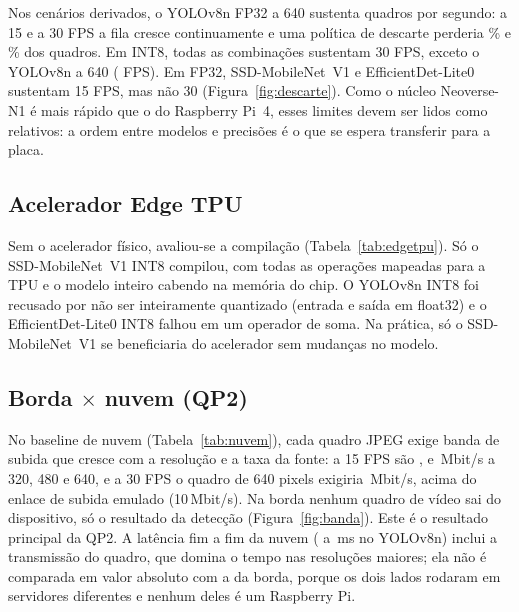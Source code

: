 Nos cenários derivados, o YOLOv8n FP32 a 640 sustenta \fpsYoloFpSeis{} quadros por segundo: a 15 e a 30
FPS a fila cresce continuamente e uma política de descarte perderia \descYoloFpSeisQuinze\% e
\descYoloFpSeisTrinta\% dos quadros. Em INT8, todas as combinações sustentam 30 FPS, exceto o YOLOv8n a
640 (\fpsYoloIntSeis{} FPS). Em FP32, SSD-MobileNet~V1 e EfficientDet-Lite0 sustentam 15 FPS, mas não 30
(Figura~\ref{fig:descarte}). Como o núcleo Neoverse-N1 é mais rápido que o do Raspberry Pi~4, esses
limites devem ser lidos como relativos: a ordem entre modelos e precisões é o que se espera transferir
para a placa.




\subsection{Acelerador Edge TPU}
Sem o acelerador físico, avaliou-se a compilação (Tabela~\ref{tab:edgetpu}). Só o SSD-MobileNet~V1 INT8
compilou, com todas as operações mapeadas para a TPU e o modelo inteiro cabendo na memória do chip. O
YOLOv8n INT8 foi recusado por não ser inteiramente quantizado (entrada e saída em float32) e o
EfficientDet-Lite0 INT8 falhou em um operador de soma. Na prática, só o SSD-MobileNet~V1 se beneficiaria
do acelerador sem mudanças no modelo.



\subsection{Borda $\times$ nuvem (QP2)}
No baseline de nuvem (Tabela~\ref{tab:nuvem}), cada quadro JPEG exige banda de subida que cresce com a
resolução e a taxa da fonte: a 15 FPS são \bandaTresQuinze{}, \bandaQuatroQuinze{} e
\bandaSeisQuinze{}\,Mbit/s a 320, 480 e 640, e a 30 FPS o quadro de 640 pixels exigiria
\bandaSeisTrinta{}\,Mbit/s, acima do enlace de subida emulado (10\,Mbit/s). Na borda nenhum quadro de
vídeo sai do dispositivo, só o resultado da detecção (Figura~\ref{fig:banda}). Este é o resultado
principal da QP2. A latência fim a fim da nuvem (\etoeYoloFpTresNuvem{} a \etoeYoloFpSeisNuvem{}\,ms
no YOLOv8n) inclui a transmissão do quadro, que domina o tempo nas resoluções maiores; ela não é
comparada em valor absoluto com a da borda, porque os dois lados rodaram em servidores diferentes e
nenhum deles é um Raspberry Pi.



